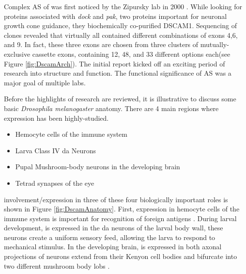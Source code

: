 Complex AS of\dscam{} was first noticed by the Zipursky lab in 2000 \citep{Schmucker2000}. While looking for proteins associated with \textit{dock} and \textit{pak}, two proteins important for neuronal growth cone guidance, they biochemically co-purified DSCAM1. Sequencing of \dscam{} clones revealed that virtually all contained different combinations of exons 4,6, and 9. In fact, these three exons are chosen from three clusters of mutually-exclusive cassette exons, containing 12, 48, and 33 different options each(see Figure \ref{fig:DscamArch}). The initial report kicked off an exciting period of research into \dscam{} structure and function. The functional significance of \dscam{} AS was a major goal of multiple labs.

Before the highlights of \dscam{} research are reviewed, it is illustrative to discuss some basic \textit{Drosophila melanogaster} anatomy. There are 4 main regions where \dscam{} expression has been highly-studied.


\begin{itemize} \itemsep0.5pt \parskip0pt 
  \item Hemocyte cells of the immune system
  \item Larva Class IV da Neurons 
  \item Pupal Mushroom-body neurons in the developing brain
  \item Tetrad synapses of the eye
\end{itemize}

\dscam{} involvement/expression in three of these four  biologically important roles is shown in Figure \ref{fig:DscamAnatomy}. First, \dscam{} expression in hemocyte cells of the immune system is important for recognition of foreign antigens \citep{Watson2005}. During larval development, \dscam{} is expressed in the da neurons of the larval body wall, these neurons create a uniform sensory feed, allowing the larva to respond to mechanical stimulus. In the developing brain, \dscam{} is expressed in both axonal projections of neurons extend from their Kenyon cell bodies and bifurcate into two different mushroom body lobs \citep{Zhan2004}. 

